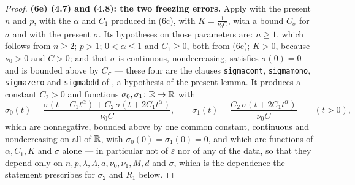 \begin{proof}
\textbf{(6e) \textup{(4.7)} and \textup{(4.8)}: the two freezing errors.}
Apply  with the present $n$ and $p$, with the
$\alpha$ and $C_1$ produced in (6c), with $K=\frac1{\nu_0C}$, with a bound
$C_\sigma$ for $\sigma$ and with the present $\sigma$.  Its hypotheses on those
parameters are: $n\ge1$, which follows from $n\ge2$; $p>1$;
$0<\alpha\le1$ and $C_1\ge0$, both from (6c); $K>0$, because $\nu_0>0$ and
$C>0$; and that $\sigma$ is continuous, nondecreasing, satisfies $\sigma(0)=0$
and is bounded above by $C_\sigma$ --- these four are the clauses
\texttt{sigmacont}, \texttt{sigmamono}, \texttt{sigmazero} and
\texttt{sigmabdd} of , a hypothesis of the
present lemma.  It produces a constant $C_2>0$ and functions
$\sigma_0,\sigma_1\colon\mathbb{R}\to\mathbb{R}$ with
\[
\sigma_0(t)=\frac{\sigma(t+C_1t^{\alpha})+C_2\,\sigma(t+2C_1t^{\alpha})}{\nu_0C},
\qquad
\sigma_1(t)=\frac{C_2\,\sigma(t+2C_1t^{\alpha})}{\nu_0C}
\qquad(t>0),
\]
which are nonnegative, bounded above by one common constant, continuous and
nondecreasing on all of $\mathbb{R}$, with $\sigma_0(0)=\sigma_1(0)=0$, and which are
functions of $\alpha,C_1,K$ and $\sigma$ alone --- in particular not of
$\varepsilon$ nor of any of the data, so that they depend only on
$n,p,\lambda,\Lambda,a,\nu_0,\nu_1,M,d$ and $\sigma$, which is the dependence
the statement prescribes for $\sigma_2$ and $R_1$ below.


\end{proof}
